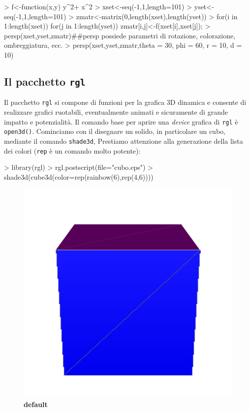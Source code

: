 \documentclass[onecolumn,11pt]{book}
\begin{document}
\begin{Schunk}
\begin{Sinput}
> f<-function(x,y)  y^2+ x^2
> xset<-seq(-1,1,length=101)
> yset<-seq(-1,1,length=101)
> zmatr<-matrix(0,length(xset),length(yset))
> for(i in 1:length(xset)) for(j in 1:length(yset)) zmatr[i,j]<-f(xset[i],xset[j]);
> persp(xset,yset,zmatr)##persp possiede parametri di rotazione, colorazione, ombreggiatura, ecc.
> persp(xset,yset,zmatr,theta = 30, phi = 60, r = 10, d = 10)
\end{Sinput}
\end{Schunk}

 
\subsection{Il pacchetto \texttt{rgl}}

Il pacchetto \texttt{rgl} si compone di funzioni per la grafica 3D dinamica e consente di realizzare grafici ruotabili, eventualmente animati e sicuramente di grande impatto e potenzialit\`a.
Il comando base per aprire una \emph{device} grafica di \texttt{rgl} \`e \texttt{open3d()}.
Cominciamo con il disegnare un solido, in particolare un cubo, mediante il comando \texttt{shade3d},
Prestiamo attenzione alla  generazione della lista dei   colori (\texttt  {rep} \`e un comando molto potente):

\begin{Schunk}
\begin{Sinput}
> library(rgl)
> rgl.postscript(file="cubo.eps")
> shade3d(cube3d(color=rep(rainbow(6),rep(4,6))))
\end{Sinput}
\end{Schunk}
\begin{figure}[htbp]
\begin{center}
\includegraphics[height=2.in]{../grafici/cubo.pdf}
\caption{{\bf default}}
\label{default}
\end{center}
\end{figure}
\end{document}
